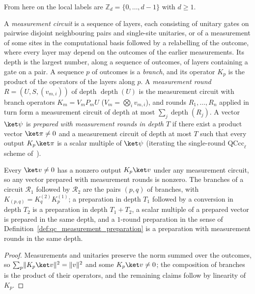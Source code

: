 From here on the local labels are $\mathbb Z_d=\{0,\dots,d-1\}$ with $d\ge1$.

\begin{definition}
    \label{def:qc_measurement_rounds}
    \leanok
    A \emph{measurement circuit} is a sequence of layers, each consisting of unitary gates on pairwise disjoint neighbouring pairs and single-site unitaries, or of a measurement of some sites in the computational basis followed by a relabelling of the outcome, where every layer may depend on the outcomes of the earlier measurements. Its depth is the largest number, along a sequence of outcomes, of layers containing a gate on a pair. A sequence $p$ of outcomes is a \emph{branch}, and its operator $K_p$ is the product of the operators of the layers along $p$. A \emph{measurement round} $R=(U,S,(v_{m,i}))$ of depth $\operatorname{depth}(U)$ is the measurement circuit with branch operators $K_m=V_mP_mU$ ($V_m=\bigotimes_i v_{m,i}$), and rounds $R_1,\dots,R_n$ applied in turn form a measurement circuit of depth at most $\sum_j\operatorname{depth}(R_j)$. A vector $\ket\psi$ is \emph{prepared with measurement rounds in depth $T$} if there exist a product vector $\ket\pi\neq0$ and a measurement circuit of depth at most $T$ such that every output $K_p\ket\pi$ is a scalar multiple of $\ket\psi$ (iterating the single-round $\mathrm{QCcc}_\ell$ scheme of~\cite{Piroli2021LOCC}).
\end{definition}

\begin{lemma}
    \label{lem:qc_measurement_rounds_outputs}
    \leanok
    Every $\ket v\neq0$ has a nonzero output $K_p\ket v$ under any measurement circuit, so any vector prepared with measurement rounds is nonzero. The branches of a circuit $\mathcal R_1$ followed by $\mathcal R_2$ are the pairs $(p,q)$ of branches, with $K_{(p,q)}=K^{(2)}_qK^{(1)}_p$; a preparation in depth $T_1$ followed by a conversion in depth $T_2$ is a preparation in depth $T_1+T_2$, a scalar multiple of a prepared vector is prepared in the same depth, and a $1$-round preparation in the sense of Definition~\ref{def:qc_measurement_preparation} is a preparation with measurement rounds in the same depth.
\end{lemma}
\begin{proof}
    \leanok
    Measurements and unitaries preserve the norm summed over the outcomes, so $\sum_p\lVert K_p\ket v\rVert^2=\lVert v\rVert^2$ and some $K_p\ket v\neq0$; the composition of branches is the product of their operators, and the remaining claims follow by linearity of $K_p$.
\end{proof}

